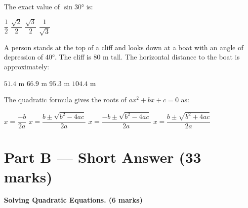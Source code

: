 \documentclass[addpoints]{exam}
\begin{document}
\begin{questions}
\question[1] The exact value of $\sin 30°$ is:
\begin{choices}
    \correctchoice $\dfrac{1}{2}$
    \choice $\dfrac{\sqrt{2}}{2}$
    \choice $\dfrac{\sqrt{3}}{2}$
    \choice $\dfrac{1}{\sqrt{3}}$
\end{choices}
\vspace{3mm}

\question[1] A person stands at the top of a cliff and looks down at a boat with an angle of depression of $40°$. The cliff is 80 m tall. The horizontal distance to the boat is approximately:
\begin{choices}
    \choice $51.4$ m
    \choice $66.9$ m
    \correctchoice $95.3$ m
    \choice $104.4$ m
\end{choices}
\vspace{3mm}

\question[1] The quadratic formula gives the roots of $ax^2 + bx + c = 0$ as:
\begin{choices}
    \choice $x = \dfrac{-b}{2a}$
    \choice $x = \dfrac{b \pm \sqrt{b^2 - 4ac}}{2a}$
    \correctchoice $x = \dfrac{-b \pm \sqrt{b^2 - 4ac}}{2a}$
    \choice $x = \dfrac{b \pm \sqrt{b^2 + 4ac}}{2a}$
\end{choices}
\vspace{5mm}

\section*{Part B --- Short Answer (33 marks)}

\question \textbf{Solving Quadratic Equations. (6 marks)}

\end{questions}
\end{document}
